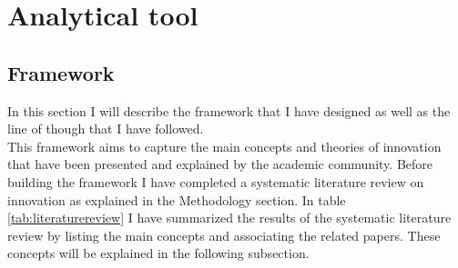 
\chapter{Analytical tool} %

\label{Chapter4} %




\section{Framework}
In this section I will describe the framework that I have designed as well as the line of though that I have followed. \\
This framework aims to capture the main concepts and theories of innovation that have been presented and explained by the academic community.
Before building the framework I have completed a systematic literature review on innovation as explained in the Methodology section. In table \ref{tab:literaturereview} I have summarized the results of the systematic literature review by listing the main concepts and associating the related papers. These concepts will be explained in the following subsection.

